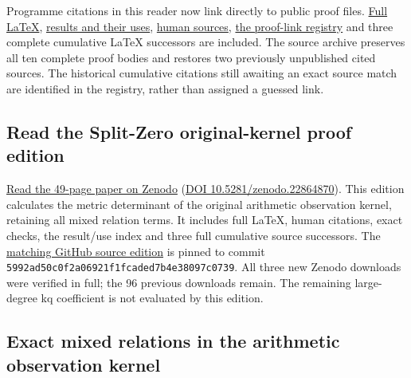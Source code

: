 \documentclass[
]{article}
\begin{document}
Programme citations in this reader now link directly to public proof
files.
\href{https://github.com/KokunoYumeto/zeta-function-research-reader/blob/main/workbenches/splitzero-tandem/continuations/20260921-kernel-degree-steps/COMPLETE_PROOFS.tex}{Full
LaTeX},
\href{https://github.com/KokunoYumeto/zeta-function-research-reader/blob/main/workbenches/splitzero-tandem/continuations/20260921-kernel-degree-steps/RESULT_INDEX.json}{results
and their uses},
\href{https://github.com/KokunoYumeto/zeta-function-research-reader/blob/main/workbenches/splitzero-tandem/continuations/20260921-kernel-degree-steps/SOURCE_USE_LEDGER.json}{human
sources},
\href{https://github.com/KokunoYumeto/zeta-function-research-reader/blob/main/workbenches/splitzero-tandem/continuations/20260921-kernel-degree-steps/CITATION_LINKS.json}{the
proof-link registry} and three complete cumulative LaTeX successors are
included. The source archive preserves all ten complete proof bodies and
restores two previously unpublished cited sources. The historical
cumulative citations still awaiting an exact source match are identified
in the registry, rather than assigned a guessed link.

\subsection{Read the Split-Zero original-kernel proof
edition}\label{read-the-split-zero-original-kernel-proof-edition}

\href{https://zenodo.org/records/22864870}{Read the 49-page paper on
Zenodo} (\href{https://doi.org/10.5281/zenodo.22864870}{DOI
10.5281/zenodo.22864870}). This edition calculates the metric
determinant of the original arithmetic observation kernel, retaining all
mixed relation terms. It includes full LaTeX, human citations, exact
checks, the result/use index and three full cumulative source
successors. The
\href{https://github.com/KokunoYumeto/zeta-function-research-reader/blob/5992ad50c0f2a06921f1fcaded7b4e38097c0739/workbenches/splitzero-tandem/continuations/20260920-original-kernel-mixed-determinants/README.md}{matching
GitHub source edition} is pinned to commit
\texttt{5992ad50c0f2a06921f1fcaded7b4e38097c0739}. All three new Zenodo
downloads were verified in full; the 96 previous downloads remain. The
remaining large-degree kq coefficient is not evaluated by this edition.

\subsection{Exact mixed relations in the arithmetic observation
kernel}\label{exact-mixed-relations-in-the-arithmetic-observation-kernel}
\end{document}
